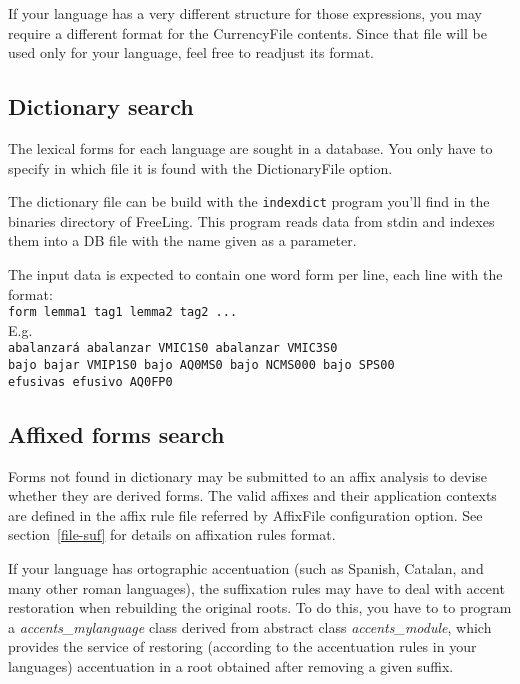 \documentclass[a4paper]{book}
\begin{document}
    If your language has a very different structure for those
    expressions, you may require a different format for the 
    CurrencyFile contents. Since that file will be used only 
    for your language, feel free to readjust its format.

   \subsection{Dictionary search} 
    The lexical forms for each language are sought in a database.
    You only have to specify in which file it is found
    with the DictionaryFile option.

    The dictionary file can be build with the {\tt indexdict} program
    you'll find in the binaries directory of FreeLing. This program
    reads data from stdin and indexes them into a DB file with the
    name given as a parameter.
   
    The input data is expected to contain one word form per line, each line
    with the format: \\
    {\tt form lemma1 tag1 lemma2 tag2 ...}\\
    E.g.\\
    {\tt abalanzar\'a abalanzar VMIC1S0 abalanzar VMIC3S0\\
    bajo bajar VMIP1S0 bajo AQ0MS0 bajo NCMS000 bajo SPS00\\
    efusivas efusivo AQ0FP0}

   \subsection{Affixed forms search} 
    Forms not found in dictionary may be submitted to an affix
    analysis to devise whether they are derived forms. The valid
    affixes and their application contexts are defined in the 
    affix rule file referred by AffixFile configuration option. 
    See section~\ref{file-suf} for details on affixation rules
    format.
   
     If your language has ortographic accentuation (such as Spanish,
    Catalan, and many other roman languages), the suffixation rules
    may have to deal with accent restoration when rebuilding the
    original roots. To do this, you have to to program a {\em
    accents\_mylanguage} class derived from abstract class {\em
    accents\_module}, which provides the service of restoring
    (according to the accentuation rules in your languages)
    accentuation in a root obtained after removing a given suffix.
\end{document}
